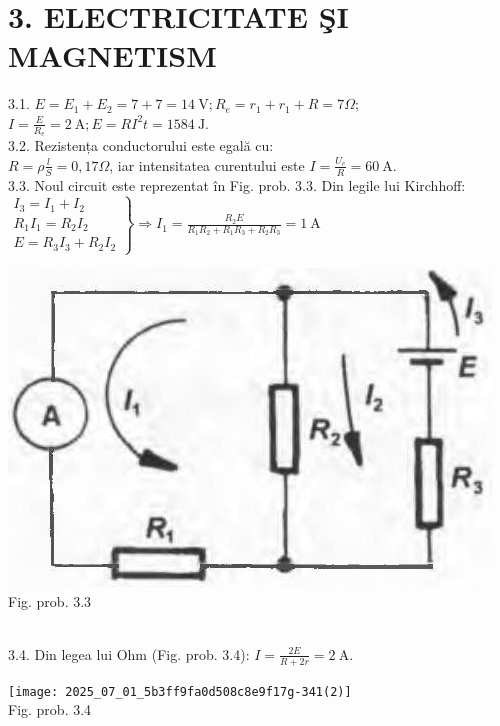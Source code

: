 
\section*{3. ELECTRICITATE ŞI MAGNETISM}

3.1. $E=E_{1}+E_{2}=7+7=14 \mathrm{~V} ; R_{e}=r_{1}+r_{1}+R=7 \Omega$;\\ $I=\frac{E}{R_{e}}=2 \mathrm{~A} ; E=R I^{2} t=1584 \mathrm{~J}$.\\

3.2. Rezistența conductorului este egală cu:\\ $R=\rho \frac{l}{S}=0,17 \Omega$, iar intensitatea curentului este $I=\frac{U_{c}}{R}=60 \mathrm{~A}$.\\

3.3. Noul circuit este reprezentat în Fig. prob. 3.3. Din legile lui Kirchhoff:\\ $\left.\begin{array}{l} I_{3}=I_{1}+I_{2} \\ R_{1} I_{1}=R_{2} I_{2} \\ E=R_{3} I_{3}+R_{2} I_{2} \end{array}\right\} \Rightarrow I_{1}=\frac{R_{2} E}{R_{1} R_{2}+R_{1} R_{3}+R_{2} R_{3}}=1 \mathrm{~A}$\\ \begin{center} \includegraphics[max width=\textwidth]{images/2025_07_01_5b3ff9fa0d508c8e9f17g-341(1)}\\ Fig. prob. 3.3 \end{center}\\

3.4. Din legea lui Ohm (Fig. prob. 3.4): $I=\frac{2 E}{R+2 r}=2 \mathrm{~A}$.\\ \begin{center} \texttt{[image: 2025\_07\_01\_5b3ff9fa0d508c8e9f17g-341(2)]}\\ Fig. prob. 3.4 \end{center}\\

